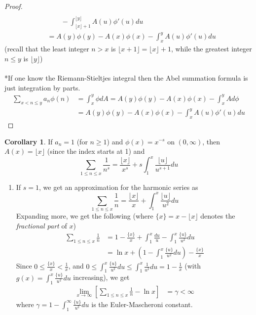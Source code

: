 \documentclass{article}
\theoremstyle{definition}
\newtheorem{corollary}[theorem]{Corollary}
\begin{document}
\begin{shaded}
\begin{proof}
\begin{align*}
\\
& \qquad - \int_{\lfloor x \rfloor + 1}^{\lfloor y \rfloor} A(u) \phi'(u) du
\\
& = A(y) \phi(y) - A(x) \phi(x) - \int_x^y A(u) \phi'(u) du
\end{align*}
(recall that the least integer $n > x$ is $\lfloor x + 1 \rfloor = \lfloor x \rfloor + 1$, while the greatest integer $n \leq y$ is $\lfloor y \rfloor$)
\\
\\
*If one know the Riemann-Stieltjes integral then the Abel summation formula is just integration by parts.
\begin{align*}
\sum_{x < n \leq y} a_n \phi(n) & = \int_x^y \phi dA = A(y) \phi(y) - A(x) \phi(x)  - \int_x^y A d\phi
\\
& = A(y) \phi(y) - A(x) \phi(x)  - \int_x^y A(u) \phi'(u) du
\end{align*}
\end{proof}
\begin{corollary} \label{zeta-mellin-cont}
If $a_n = 1$ (for $n \geq 1$) and $\phi(x) = x^{-s}$ on $(0, \infty)$, then $A(x) = \lfloor x \rfloor$ (since the index starts at 1) and
$$\sum_{1 \leq n \leq x} \frac{1}{n^s} = \frac{\lfloor x \rfloor}{x^s} + s \int_1^x \frac{\lfloor u \rfloor}{u^{s + 1}} du$$
\begin{enumerate}
	\item If $s = 1$, we get an approximation for the harmonic series as
	$$\sum_{1 \leq n \leq x} \frac{1}{n} = \frac{\lfloor x \rfloor}{x} + \int_1^x \frac{\lfloor u \rfloor}{u^2} du$$
	Expanding more, we get the following (where $\{ x \} = x - \lfloor x \rfloor$ denotes the \emph{fractional part} of $x$)
	\begin{align*}
	\sum_{1 \leq n \leq x} \frac{1}{n} & = 1 - \frac{\{ x \}}{x} + \int_1^x \frac{du}{u} - \int_1^x \frac{\{ u \}}{u^2} du
	\\
	& = \ln x + \left( 1 - \int_1^x \frac{\{ u \}}{u^2} du \right) - \frac{\{ x \}}{x}
	\end{align*}
	Since $0 \leq \frac{\{ x \}}{x} < \frac{1}{x}$, and $0 \leq \int_1^x \frac{\{ u \}}{u^2} du \leq \int_1^x \frac{1}{u^2} du = 1 - \frac{1}{x}$ (with $g(x) = \int_1^x \frac{\{ u \}}{u^2} du$ increasing), we get
	\begin{align*}
	\lim_{x \to \infty} \left[ \sum_{1 \leq n \leq x} \frac{1}{n} - \ln x \right] & = \gamma < \infty
	\end{align*}
	where $\gamma = 1 - \int_1^\infty \frac{\{ u \}}{u^2} du$ is the Euler-Mascheroni constant.

\end{enumerate}
\end{corollary}
\end{shaded}
\end{document}
